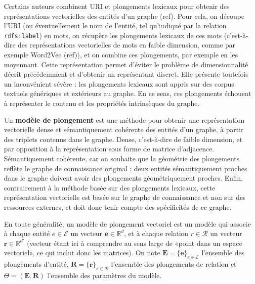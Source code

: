 Certains auteurs combinent URI et plongements lexicaux pour obtenir des représentations vectorielles des entités d'un graphe (ref). Pour cela, on découpe l'URI (ou éventuellement le nom de l'entité, tel qu'indiqué par la relation \texttt{rdfs:label}) en mots, on récupère les plongements lexicaux de ces mots (c'est-à-dire des représentations vectorielles de mots en faible dimension, comme par exemple Word2Vec (ref)), et on combine ces plongements, par exemple en les moyennant. Cette représentation permet d'éviter le problème de dimensionnalité décrit précédemment et d'obtenir un représentant discret. Elle présente toutefois un inconvénient sévère : les plongements lexicaux sont appris sur des corpus textuels génériques et extérieurs au graphe. En ce sens, ces plongements échouent à représenter le contenu et les propriétés intrinsèques du graphe. %


Un \textbf{modèle de plongement} est une méthode pour obtenir une représentation vectorielle dense et sémantiquement cohérente des entités d'un graphe, à partir des triplets contenus dans le graphe. Dense, c'est-à-dire de faible dimension, et par opposition à la représentation sous forme de matrice d'adjacence. Sémantiquement cohérente, car on souhaite que la géométrie des plongements reflète le graphe de connaissance original : deux entités sémantiquement proches dans le graphe doivent avoir des plongements géométriquement proches. Enfin, contrairement à la méthode basée sur des plongements lexicaux, cette représentation vectorielle est basée sur le graphe de connaissance et non sur des ressources externes, et doit donc tenir compte des spécificités de ce graphe.

En toute généralité, un modèle de plongement vectoriel est un modèle qui associe à chaque entité $e \in \mathcal{E}$ un vecteur $\mathbf{e} \in \mathbb{R}^d$, et à chaque relation $r \in \mathcal{R}$ un vecteur $\mathbf{r} \in \mathbb{R}^{d'}$ (vecteur étant ici à comprendre au sens large de «point dans un espace vectoriel», ce qui inclut donc les matrices). On note $\mathbf{E} = \{\mathbf{e}\}_{e \in \mathcal{E}} $ l'ensemble des plongements d'entité, $\mathbf{R} = \{\mathbf{r}\}_{r \in \mathcal{R}} $ l'ensemble des plongements de relation et $\Theta = (\mathbf{E}, \mathbf{R})$ l'ensemble des paramètres du modèle. 

